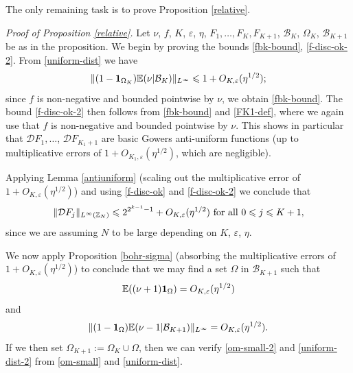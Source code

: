 \documentclass[12pt,a4paper,reqno]{amsart}
\numberwithin{equation}{section}
\theoremstyle{plain}
\theoremstyle{definition}
\renewcommand{\leq}{\leqslant}
\def\B{{\mathcal B}}
\def\D{{\mathcal D}}
\def\Z{{\mathbb Z}}
\def\E{{\mathbb E}}
\def\eps{{\varepsilon}}
\def\vs{\vspace{11pt}}
\def\ni{\noindent}
\begin{document}
\ni The only remaining task is to prove Proposition \ref{relative}.\vs

\ni\textit{Proof of Proposition \ref{relative}.}  Let $\nu$, $f$, $K$, $\eps$, $\eta$, $F_1,\ldots,F_K, F_{K+1}$, $\B_K$, $\Omega_K$, $\B_{K+1}$ 
be as in the proposition.  We begin by proving the bounds \eqref{fbk-bound}, \eqref{f-disc-ok-2}.  From \eqref{uniform-dist} we have
$$
\| (1 - {\bf 1}_{\Omega_{K}}) \E( \nu | \B_{K} )\|_{L^\infty} \leq 1 + O_{K,\eps}(\eta^{1/2});$$
since $f$ is non-negative and bounded pointwise by $\nu$, we obtain \eqref{fbk-bound}.  The bound \eqref{f-disc-ok-2} then follows
from \eqref{fbk-bound} and \eqref{FK1-def}, where we again use that $f$ is non-negative and bounded pointwise by $\nu$.
This shows in particular that $\D F_1, \ldots$, $\D F_{K_1+1}$ are basic Gowers anti-uniform functions (up to multiplicative 
errors of $1 + O_{K_1,\eps}(\eta^{1/2})$, which are negligible).\vs

\ni Applying Lemma \ref{antiuniform} (scaling out the multiplicative error of $1 + O_{K,\eps}(\eta^{1/2})$) and using
\eqref{f-disc-ok} and \eqref{f-disc-ok-2} we conclude that
\begin{equation}\label{FJ-bound}
\| \D F_j \|_{L^\infty(\Z_N)} \leq 2^{2^{k-1}-1} + O_{K,\eps}(\eta^{1/2}) \hbox{ for all } 0 \leq j \leq K+1, 
\end{equation}
since we are assuming $N$ to be large depending on $K$, $\eps$, $\eta$.\vs

\ni We now apply Proposition \ref{bohr-sigma} (absorbing the multiplicative errors of $1+O_{K,\eps}(\eta^{1/2})$) 
to conclude that we may find a set $\Omega$ in $\B_{K+1}$ such that
$$ \E( (\nu + 1) {\bf 1}_{\Omega} ) = O_{K,\eps}(\eta^{1/2})$$
and
$$
 \| (1 - {\bf 1}_{\Omega}) \E(\nu - 1 | \B_{K+1}) \|_{L^\infty} = O_{K,\eps}(\eta^{1/2}).$$
If we then set $\Omega_{K+1} := \Omega_K \cup \Omega$, then we can verify \eqref{om-small-2} and
\eqref{uniform-dist-2} from \eqref{om-small} and \eqref{uniform-dist}.\vs
 
\end{document}
